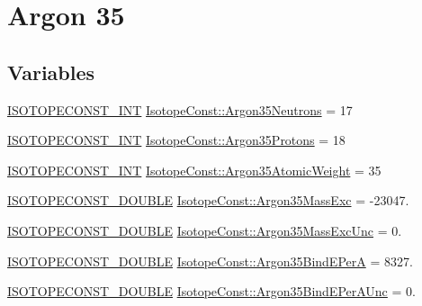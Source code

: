 \hypertarget{group___isotope_const-_argon-_ar35}{}\section{Argon 35}
\label{group___isotope_const-_argon-_ar35}
\subsection*{Variables}
\begin{DoxyCompactItemize}
\item 
\mbox{\hyperlink{group___isotope_const-_macros_ga5f18360b3e99483a35c32d789e62621c}{I\+S\+O\+T\+O\+P\+E\+C\+O\+N\+S\+T\+\_\+\+I\+NT}} \mbox{\hyperlink{group___isotope_const-_argon-_ar35_ga127775dcbf46db21897f12e69008d722}{Isotope\+Const\+::\+Argon35\+Neutrons}} = 17
\item 
\mbox{\hyperlink{group___isotope_const-_macros_ga5f18360b3e99483a35c32d789e62621c}{I\+S\+O\+T\+O\+P\+E\+C\+O\+N\+S\+T\+\_\+\+I\+NT}} \mbox{\hyperlink{group___isotope_const-_argon-_ar35_ga092da137c5046945dbfc8b7a53fd802b}{Isotope\+Const\+::\+Argon35\+Protons}} = 18
\item 
\mbox{\hyperlink{group___isotope_const-_macros_ga5f18360b3e99483a35c32d789e62621c}{I\+S\+O\+T\+O\+P\+E\+C\+O\+N\+S\+T\+\_\+\+I\+NT}} \mbox{\hyperlink{group___isotope_const-_argon-_ar35_gae8e5af63e446e1eb3bf2d85da6b56848}{Isotope\+Const\+::\+Argon35\+Atomic\+Weight}} = 35
\item 
\mbox{\hyperlink{group___isotope_const-_macros_ga8f45a7272ce02c0b4c65c44636ed719a}{I\+S\+O\+T\+O\+P\+E\+C\+O\+N\+S\+T\+\_\+\+D\+O\+U\+B\+LE}} \mbox{\hyperlink{group___isotope_const-_argon-_ar35_gace543f79bb2b0c4eccd26ad1d855574a}{Isotope\+Const\+::\+Argon35\+Mass\+Exc}} = -\/23047.
\item 
\mbox{\hyperlink{group___isotope_const-_macros_ga8f45a7272ce02c0b4c65c44636ed719a}{I\+S\+O\+T\+O\+P\+E\+C\+O\+N\+S\+T\+\_\+\+D\+O\+U\+B\+LE}} \mbox{\hyperlink{group___isotope_const-_argon-_ar35_gacb81df299ee4c6d84381128264bee0cf}{Isotope\+Const\+::\+Argon35\+Mass\+Exc\+Unc}} = 0.
\item 
\mbox{\hyperlink{group___isotope_const-_macros_ga8f45a7272ce02c0b4c65c44636ed719a}{I\+S\+O\+T\+O\+P\+E\+C\+O\+N\+S\+T\+\_\+\+D\+O\+U\+B\+LE}} \mbox{\hyperlink{group___isotope_const-_argon-_ar35_ga59e69a092c1a6ca4555922aba5d26037}{Isotope\+Const\+::\+Argon35\+Bind\+E\+PerA}} = 8327.
\item 
\mbox{\hyperlink{group___isotope_const-_macros_ga8f45a7272ce02c0b4c65c44636ed719a}{I\+S\+O\+T\+O\+P\+E\+C\+O\+N\+S\+T\+\_\+\+D\+O\+U\+B\+LE}} \mbox{\hyperlink{group___isotope_const-_argon-_ar35_ga73ec9e677d83552eda4f56dd80421ff4}{Isotope\+Const\+::\+Argon35\+Bind\+E\+Per\+A\+Unc}} = 0.

\end{DoxyCompactItemize}
